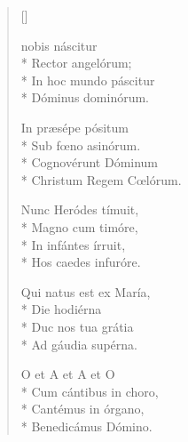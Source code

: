 \newHymn
{}

\begin{verse}[\versewidth]

 nobis náscitur\\*
Rector angelórum;\\*
In hoc mundo páscitur\\*
Dóminus dominórum.
\pointtrans

 In præsépe pósitum\\*
Sub fœno asinórum.\\*
Cognovérunt Dóminum\\*
Christum Regem Cœlórum.

 Nunc Heródes tímuit,\\*
Magno cum timóre,\\*
In infántes írruit,\\*
Hos caedes infuróre.

 Qui natus est ex María,\\*
Die hodiérna\\*
Duc nos tua grátia\\*
Ad gáudia supérna.

 O et A et A et O\\*
Cum cántibus in choro,\\*
Cantémus in órgano,\\*
Benedicámus Dómino.

\end{verse}



